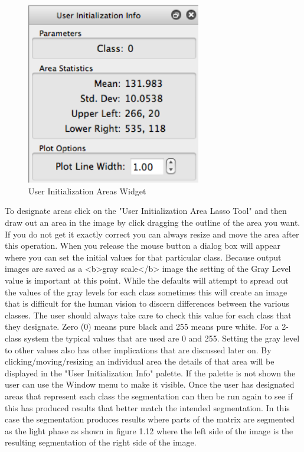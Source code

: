 \documentclass[12pt,oneside]{book}
\begin{document}
\begin{figure}[htbp]
\begin{center}
\includegraphics[width=3.00in]{images/Untitled9.png}
\caption{User Initialization Areas Widget}
\label{image9}
\end{center}
\end{figure}

To designate areas click on the "User Initialization Area Lasso Tool" and then draw out an area in the image by click dragging the outline of the area you want. If you do not get it exactly correct you can always resize and move the area after this operation. When you release the mouse button a dialog box will appear where you can set the initial values for that particular class. Because output images are saved as a <b>gray scale</b> image the setting of the Gray Level value is important at this point. While the defaults will attempt to spread out the values of the gray levels for each class sometimes this will create an image that is difficult for the human vision to discern differences between the various classes. The user should always take care to check this value for each class that they designate. Zero (0) means pure black and 255 means pure white. For a 2-class system the typical values that are used are 0 and 255. Setting the gray level to other values also has other implications that are discussed later on. By clicking/moving/resizing an individual area the details of that area will be displayed in the "User Initialization Info" palette. If the palette is not shown the user can use the Window menu to make it visible. 
Once the user has designated areas that represent each class the segmentation can then be run again to see if this has produced results that better match the intended segmentation. In this case the segmentation produces results where parts of the matrix are segmented as the light phase as shown in figure 1.12 where the left side of the image is the resulting segmentation of the right side of the image.
 
\end{document}

